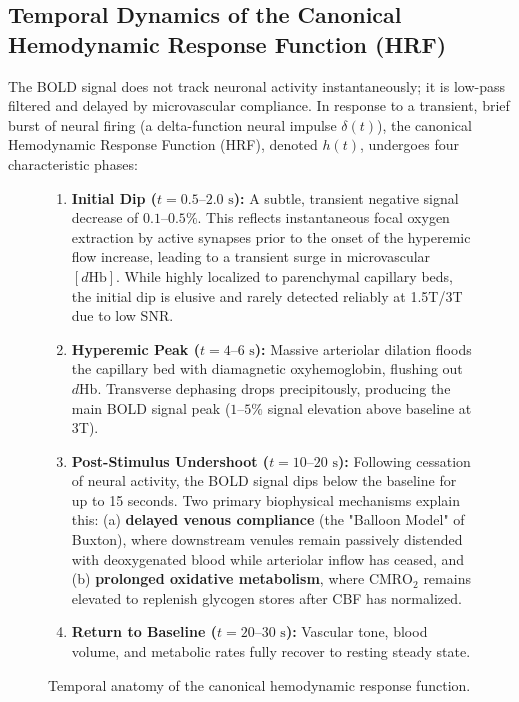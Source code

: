 \documentclass[11pt,a4paper]{article}
\begin{document}
\subsection{Temporal Dynamics of the Canonical Hemodynamic Response Function (HRF)}
The BOLD signal does not track neuronal activity instantaneously; it is low-pass filtered and delayed by microvascular compliance. In response to a transient, brief burst of neural firing (a delta-function neural impulse $\delta(t)$), the canonical Hemodynamic Response Function (HRF), denoted $h(t)$, undergoes four characteristic phases:

\begin{figure}[htbp]
\centering
\begin{tcolorbox}[colback=blue!5!white,colframe=blue!60!black,title=\textbf{Temporal Phases of the Hemodynamic Response Function (HRF)},width=\linewidth]
\small
\begin{enumerate}[leftmargin=1.5em]
    \item \textbf{Initial Dip ($t = 0.5\text{--}2.0\text{ s}$):} A subtle, transient negative signal decrease of $0.1\text{--}0.5\%$. This reflects instantaneous focal oxygen extraction by active synapses prior to the onset of the hyperemic flow increase, leading to a transient surge in microvascular $[d\text{Hb}]$. While highly localized to parenchymal capillary beds, the initial dip is elusive and rarely detected reliably at 1.5T/3T due to low SNR.
    \item \textbf{Hyperemic Peak ($t = 4\text{--}6\text{ s}$):} Massive arteriolar dilation floods the capillary bed with diamagnetic oxyhemoglobin, flushing out $d\text{Hb}$. Transverse dephasing drops precipitously, producing the main BOLD signal peak ($1\text{--}5\%$ signal elevation above baseline at 3T).
    \item \textbf{Post-Stimulus Undershoot ($t = 10\text{--}20\text{ s}$):} Following cessation of neural activity, the BOLD signal dips below the baseline for up to 15 seconds. Two primary biophysical mechanisms explain this: (a) \textbf{delayed venous compliance} (the "Balloon Model" of Buxton), where downstream venules remain passively distended with deoxygenated blood while arteriolar inflow has ceased, and (b) \textbf{prolonged oxidative metabolism}, where $\text{CMRO}_2$ remains elevated to replenish glycogen stores after CBF has normalized.
    \item \textbf{Return to Baseline ($t = 20\text{--}30\text{ s}$):} Vascular tone, blood volume, and metabolic rates fully recover to resting steady state.
\end{enumerate}
\end{tcolorbox}
\caption{Temporal anatomy of the canonical hemodynamic response function.}
\label{fig:hrf_phases}
\end{figure}
\end{document}

